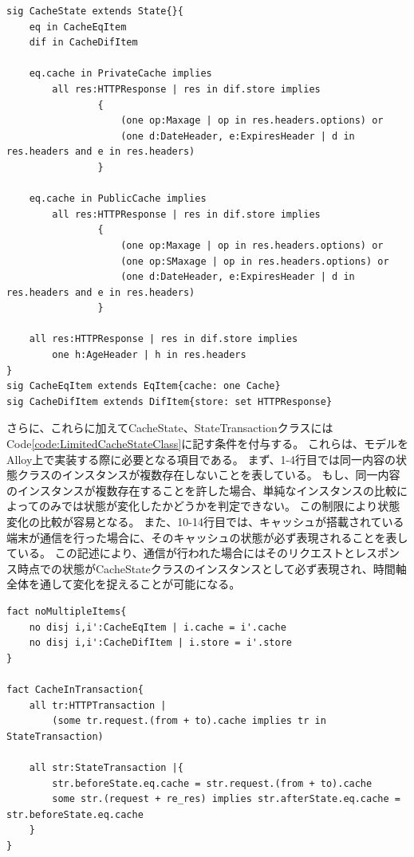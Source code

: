 \documentclass[12pt,a4paper]{jbook}
\begin{document}
\begin{lstlisting}[caption=キャッシュの状態を表すクラス, label=code:CacheStateClass]
sig CacheState extends State{}{
	eq in CacheEqItem
	dif in CacheDifItem

	eq.cache in PrivateCache implies
        all res:HTTPResponse | res in dif.store implies
                {
                    (one op:Maxage | op in res.headers.options) or
                    (one d:DateHeader, e:ExpiresHeader | d in res.headers and e in res.headers)
                }

    eq.cache in PublicCache implies
        all res:HTTPResponse | res in dif.store implies
                {
                    (one op:Maxage | op in res.headers.options) or
                    (one op:SMaxage | op in res.headers.options) or
                    (one d:DateHeader, e:ExpiresHeader | d in res.headers and e in res.headers)
                }

    all res:HTTPResponse | res in dif.store implies
        one h:AgeHeader | h in res.headers
}
sig CacheEqItem extends EqItem{cache: one Cache}
sig CacheDifItem extends DifItem{store: set HTTPResponse}
\end{lstlisting}

さらに、これらに加えてCacheState、StateTransactionクラスにはCode\ref{code:LimitedCacheStateClass}に記す条件を付与する。
これらは、モデルをAlloy上で実装する際に必要となる項目である。
まず、1-4行目では同一内容の状態クラスのインスタンスが複数存在しないことを表している。
もし、同一内容のインスタンスが複数存在することを許した場合、単純なインスタンスの比較によってのみでは状態が変化したかどうかを判定できない。
この制限により状態変化の比較が容易となる。
また、10-14行目では、キャッシュが搭載されている端末が通信を行った場合に、そのキャッシュの状態が必ず表現されることを表している。
この記述により、通信が行われた場合にはそのリクエストとレスポンス時点での状態がCacheStateクラスのインスタンスとして必ず表現され、時間軸全体を通して変化を捉えることが可能になる。
\begin{lstlisting}[caption=CacheStateクラスの制限, label=code:LimitedCacheStateClass]
fact noMultipleItems{
	no disj i,i':CacheEqItem | i.cache = i'.cache
	no disj i,i':CacheDifItem | i.store = i'.store
}

fact CacheInTransaction{
	all tr:HTTPTransaction |
		(some tr.request.(from + to).cache implies tr in StateTransaction)

	all str:StateTransaction |{
		str.beforeState.eq.cache = str.request.(from + to).cache
		some str.(request + re_res) implies str.afterState.eq.cache = str.beforeState.eq.cache
	}
}
\end{lstlisting}
\end{document}
